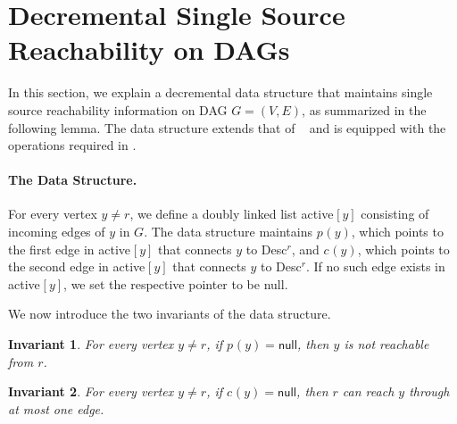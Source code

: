 \documentclass[11pt]{article}
\newtheorem{invariant}{Invariant}[section]
\newcommand{\DAG}[1]{\textrm{{\normalfont DAG} \( #1 \)}\xspace}
\newcommand{\nul}[0]{\textsf{null}\xspace}
\newcommand{\desc}[1]{\textrm{{\normalfont Desc}\( ^{ #1 }\)}\xspace}
\newcommand{\activee}[2]{\textrm{\normalfont active\( ^{  } [ #1 ] \)}\xspace} \newcommand{\inn}[2]{\textrm{\normalfont in\( ^{ } [ #1 ] \)}\xspace}
\newcommand{\cc}[2]{\ensuremath{ c^{} (#1) }}
\newcommand{\parent}[2]{\ensuremath{ p^{} (#1) }}
\begin{document}
\appendix











\section{Decremental Single Source Reachability on DAGs} \label{app:dag}



In this section, 
we explain a decremental data structure that maintains single source reachability information 
on \DAG{G = (V, E)}, as summarized in the following lemma.
The data structure extends that of \citeauthor{Italiano:1988aa}~\cite{Italiano:1988aa}
and is equipped with the operations required in .



\italiano*







\paragraph*{The Data Structure.}

For every vertex \( y \neq r \), we define a doubly linked list \activee{y}{r} consisting of incoming edges of \( y \) in \( G \).
The data structure maintains \parent{y}{r}, which points to the first edge in \activee{y}{r} that connects \( y \) to \desc{r}, and \cc{y}{r}, which points to the second edge in \activee{y}{r} that connects \( y \) to \desc{r}.
If no such edge exists in \activee{y}{r},
we set the respective pointer to be \nul.

We now introduce the two invariants of the data structure. 
\begin{invariant} \label{invar:tree}
For every vertex \( y \neq r \), if \( \parent{y}{r} = \nul \), then \( y \) is not reachable from \(r\).
\end{invariant}

\begin{invariant} \label{invar:other}
For every vertex \( y \neq r \),  if \( \cc{y}{r} = \nul \), then \( r \) can reach \(y\) through at most one edge.
\end{invariant}
\end{document}
